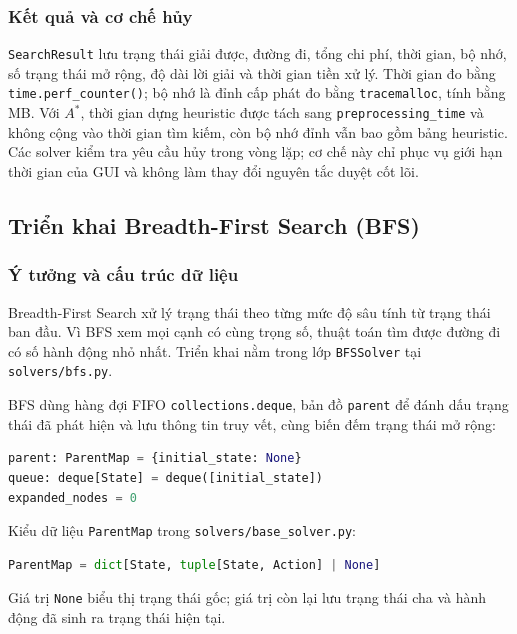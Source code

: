 \subsubsection{Kết quả và cơ chế hủy}
\texttt{SearchResult} lưu trạng thái giải được, đường đi, tổng chi phí, thời gian, bộ nhớ, số trạng thái mở rộng, độ dài lời giải và thời gian tiền xử lý. Thời gian đo bằng \texttt{time.perf\_counter()}; bộ nhớ là đỉnh cấp phát đo bằng \texttt{tracemalloc}, tính bằng MB. Với $A^*$, thời gian dựng heuristic được tách sang \texttt{preprocessing\_time} và không cộng vào thời gian tìm kiếm, còn bộ nhớ đỉnh vẫn bao gồm bảng heuristic. Các solver kiểm tra yêu cầu hủy trong vòng lặp; cơ chế này chỉ phục vụ giới hạn thời gian của GUI và không làm thay đổi nguyên tắc duyệt cốt lõi.

\subsection{Triển khai Breadth-First Search (BFS)}

\subsubsection{Ý tưởng và cấu trúc dữ liệu}
Breadth-First Search xử lý trạng thái theo từng mức độ sâu tính từ trạng thái ban đầu. Vì BFS xem mọi cạnh có cùng trọng số, thuật toán tìm được đường đi có số hành động nhỏ nhất. Triển khai nằm trong lớp \texttt{BFSSolver} tại \texttt{solvers/bfs.py}.

BFS dùng hàng đợi FIFO \texttt{collections.deque}, bản đồ \texttt{parent} để đánh dấu trạng thái đã phát hiện và lưu thông tin truy vết, cùng biến đếm trạng thái mở rộng:
\begin{lstlisting}[language=Python]
parent: ParentMap = {initial_state: None}
queue: deque[State] = deque([initial_state])
expanded_nodes = 0
\end{lstlisting}
Kiểu dữ liệu \texttt{ParentMap} trong \texttt{solvers/base\_solver.py}:
\begin{lstlisting}[language=Python]
ParentMap = dict[State, tuple[State, Action] | None]
\end{lstlisting}
Giá trị \texttt{None} biểu thị trạng thái gốc; giá trị còn lại lưu trạng thái cha và hành động đã sinh ra trạng thái hiện tại.

